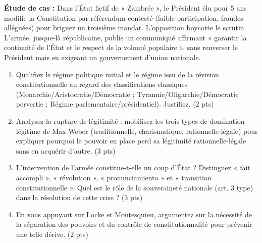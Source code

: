 \documentclass[11pt]{article}
\begin{document}
\begin{exercice}
\textbf{Étude de cas :} Dans l'État fictif de « Zambrée », le Président élu pour 5 ans modifie la Constitution par référendum contesté (faible participation, fraudes alléguées) pour briguer un troisième mandat. L'opposition boycotte le scrutin. L'armée, jusque-là républicaine, publie un communiqué affirmant « garantir la continuité de l'État et le respect de la volonté populaire », sans renverser le Président mais en exigeant un gouvernement d'union nationale.
\begin{enumerate}
    \item Qualifiez le régime politique initial et le régime issu de la révision constitutionnelle au regard des classifications classiques (Monarchie/Aristocratie/Démocratie ; Tyrannie/Oligarchie/Démocratie pervertie ; Régime parlementaire/présidentiel). Justifiez. (2 pts)
    \item Analysez la rupture de légitimité : mobilisez les trois types de domination légitime de Max Weber (traditionnelle, charismatique, rationnelle-légale) pour expliquer pourquoi le pouvoir en place perd sa légitimité rationnelle-légale sans en acquérir d'autre. (3 pts)
    \item L'intervention de l'armée constitue-t-elle un coup d'État ? Distinguez « fait accompli », « révolution », « pronunciamiento » et « transition constitutionnelle ». Quel est le rôle de la souveraineté nationale (art. 3 type) dans la résolution de cette crise ? (3 pts)
    \item En vous appuyant sur Locke et Montesquieu, argumentez sur la nécessité de la séparation des pouvoirs et du contrôle de constitutionnalité pour prévenir une telle dérive. (2 pts)
\end{enumerate}
\end{exercice}
\end{document}
